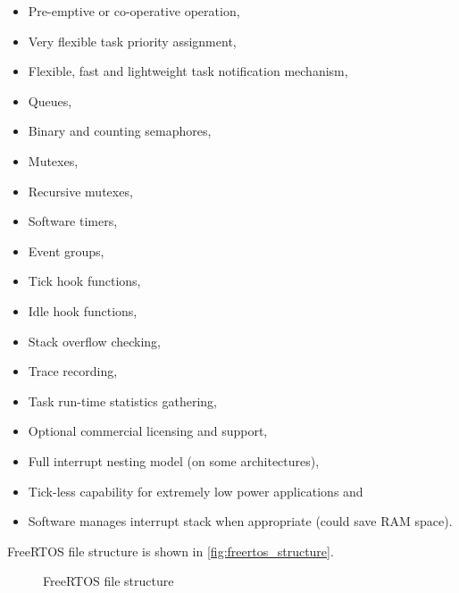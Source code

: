 \begin{itemize}
    
    \item Pre-emptive or co-operative operation,
    \item Very flexible task priority assignment,
    \item Flexible, fast and lightweight task notification mechanism,
    \item Queues,
    \item Binary and counting semaphores,
    \item Mutexes,
    \item Recursive mutexes,
    \item Software timers,
    \item Event groups,
    \item Tick hook functions,
    \item Idle hook functions,
    \item Stack overflow checking,
    \item Trace recording,
    \item Task run-time statistics gathering,
    \item Optional commercial licensing and support,
    \item Full interrupt nesting model (on some architectures),
    \item Tick-less capability for extremely low power applications and
    \item Software manages interrupt stack when appropriate (could save RAM space).
    
\end{itemize}

\noindent FreeRTOS file structure is shown in \autoref{fig:freertos_structure}.

\begin{figure}[H]
\caption{FreeRTOS file structure}
\label{fig:freertos_structure}
\end{figure}


